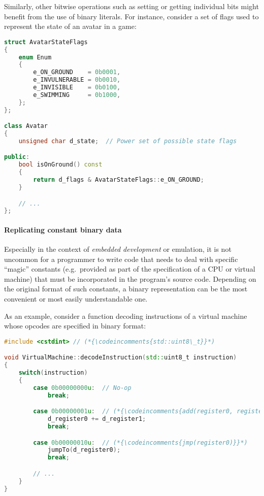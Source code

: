\documentclass[twoside,10pt,letterpaper,usenames]{newstyle-PearsonGeneric-7-38}
\newcommand{\codeincomments}{\color{skyblue}\ttfamily}
\begin{document}
Similarly, other bitwise operations such as setting or getting
individual bits might benefit from the use of binary literals. For
instance, consider a set of flags used to represent the state of an
avatar in a game:

\begin{lstlisting}[language=C++]
struct AvatarStateFlags
{
    enum Enum
    {
        e_ON_GROUND    = 0b0001,
        e_INVULNERABLE = 0b0010,
        e_INVISIBLE    = 0b0100,
        e_SWIMMING     = 0b1000,
    };
};

class Avatar
{
    unsigned char d_state;  // Power set of possible state flags

public:
    bool isOnGround() const
    {
        return d_flags & AvatarStateFlags::e_ON_GROUND;
    }

    // ...
};
\end{lstlisting}
    

\paragraph[Replicating constant binary data]{Replicating constant binary data}\label{replicating-constant-binary-data}

Especially in the context of \emph{embedded development} or emulation,
it is not uncommon for a programmer to write code that needs to deal
with specific ``magic'' constants (e.g.~provided as part of the
specification of a CPU or virtual machine) that must be incorporated in
the program's source code. Depending on the original format of such
constants, a binary representation can be the most convenient or most
easily understandable one.

As an example, consider a function decoding instructions of a virtual
machine whose opcodes are specified in binary format:

\begin{lstlisting}[language=C++]
#include <cstdint> // (*{\codeincomments{std::uint8\_t}}*)

void VirtualMachine::decodeInstruction(std::uint8_t instruction)
{
    switch(instruction)
    {
        case 0b00000000u:  // No-op
            break;

        case 0b00000001u:  // (*{\codeincomments{add(register0, register1)}}*)
            d_register0 += d_register1;
            break;

        case 0b00000010u:  // (*{\codeincomments{jmp(register0)}}*)
            jumpTo(d_register0);
            break;

        // ...
    }
}
\end{lstlisting}
    
\end{document}
